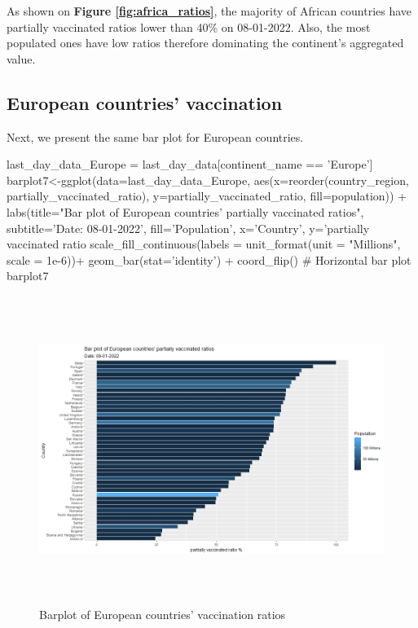As shown on \textbf{Figure \ref{fig:africa_ratios}}, the majority of African countries have partially vaccinated ratios lower than 40\% on 08-01-2022. Also, the most populated ones have low ratios therefore dominating the continent's aggregated value.

\subsection{European countries' vaccination}
Next, we present the same bar plot for European countries.

\begin{Rcode}{\scriptsize}
last_day_data_Europe = last_day_data[continent_name == 'Europe']
barplot7<-ggplot(data=last_day_data_Europe,
                 aes(x=reorder(country_region, partially_vaccinated_ratio), 
                 y=partially_vaccinated_ratio, fill=population)) +
  labs(title="Bar plot of European countries' partially vaccinated ratios",
       subtitle='Date: 08-01-2022', fill='Population',
       x='Country', y='partially vaccinated ratio %
  scale_fill_continuous(labels = unit_format(unit = "Millions", scale = 1e-6))+
  geom_bar(stat='identity') + coord_flip() # Horizontal bar plot
barplot7
\end{Rcode}

\begin{figure}[h]
    \centering
    \includegraphics[width=12cm, height=10cm]{figures/Europe_ratios.png}
    \caption{Barplot of European countries' vaccination ratios}
    \label{fig:europe_ratios}
\end{figure}
\FloatBarrier %

